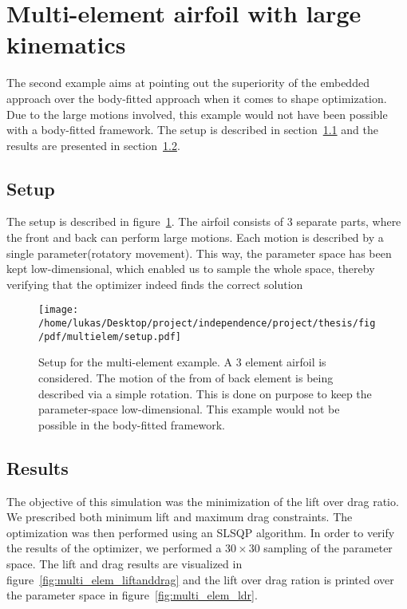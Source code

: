 \documentclass[../main.tex]{subfiles}
\begin{document}


\section{Multi-element airfoil with large kinematics}\label{sec:example_multielem}

The second example aims at pointing out the superiority of the embedded approach over the body-fitted approach when it comes to shape optimization. Due to the large motions involved, this example would not have been possible with a body-fitted framework. The setup is described in section~\ref{sec:multielem_setup} and the results are presented in section~\ref{sec:multielem_results}.

\subsection{Setup}\label{sec:multielem_setup}

The setup is described in figure~\ref{fig:multi_elem_setup}. The airfoil consists of 3 separate parts, where the front and back can perform large motions. Each motion is described by a single parameter(rotatory movement). This way, the parameter space has been kept low-dimensional, which enabled us to sample the whole space, thereby verifying that the optimizer indeed finds the correct solution

\begin{figure}[t!]
    \centering
    	\texttt{[image: /home/lukas/Desktop/project/independence/project/thesis/fig/pdf/multielem/setup.pdf]}
    	\caption[Multi-element example: setup]{Setup for the multi-element example. A 3 element airfoil is considered. The motion of the from of back element is being described via a simple rotation. This is done on purpose to keep the parameter-space low-dimensional. This example would not be possible in the body-fitted framework.}
    	\label{fig:multi_elem_setup}
\end{figure}


\subsection{Results}\label{sec:multielem_results}
The objective of this simulation was the minimization of the lift over drag ratio. We prescribed both minimum lift and maximum drag constraints. The optimization was then performed using an \ac{SLSQP} algorithm. In order to verify the results of the optimizer, we performed a $30\times30$ sampling of the parameter space. The lift and drag results are visualized in figure~\ref{fig:multi_elem_liftanddrag} and the lift over drag ration is printed over the parameter space in figure~\ref{fig:multi_elem_ldr}.
\end{document}
